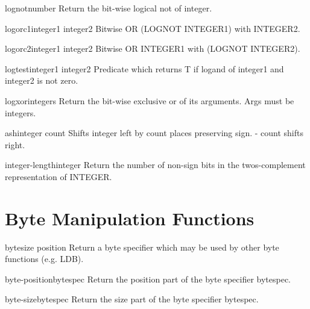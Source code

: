 \begin{function}{lognot}{number}{}{}
  Return the bit-wise logical not of integer.
\end{function}

\begin{function}{logorc1}{integer1 integer2}{}{}
  Bitwise OR (LOGNOT INTEGER1) with INTEGER2.
\end{function}

\begin{function}{logorc2}{integer1 integer2}{}{}
  Bitwise OR INTEGER1 with (LOGNOT INTEGER2).
\end{function}

\begin{function}{logtest}{integer1 integer2}{}{}
  Predicate which returns T if logand of integer1 and integer2 is not zero.
\end{function}

\begin{function}{logxor}{\rest integers}{}{}
  Return the bit-wise exclusive or of its arguments. Args must be integers.
\end{function}

\begin{function}{ash}{integer count}{}{}
  Shifts integer left by count places preserving sign. - count shifts right.
\end{function}

\begin{function}{integer-length}{integer}{}{}
  Return the number of non-sign bits in the twos-complement representation
  of INTEGER.
\end{function}

\section{Byte Manipulation Functions}
\label{sec:byte-manip-funct}

\begin{function}{byte}{size position}{}{}
  Return a byte specifier which may be used by other byte functions
  (e.g. LDB).
\end{function}

\begin{function}{byte-position}{bytespec}{}{}
  Return the position part of the byte specifier bytespec.
\end{function}

\begin{function}{byte-size}{bytespec}{}{}
  Return the size part of the byte specifier bytespec.
\end{function}

